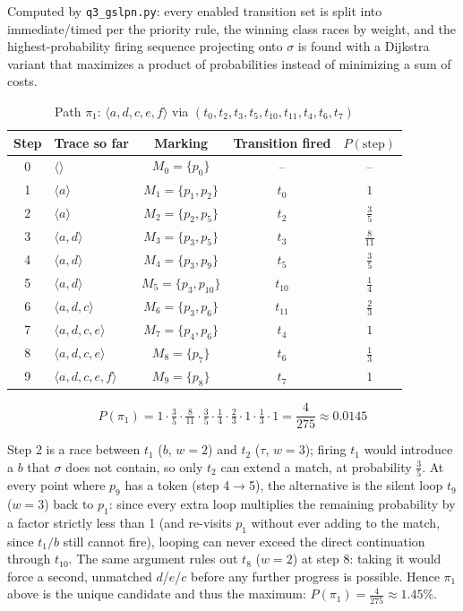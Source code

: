 \documentclass[11pt,a4paper]{article}
\makeatletter
\newenvironment{pathtrace}[2]{%
  \def\pathtracecaption{#1}%
  \def\pathtracelabel{#2}%
  \begin{table}[H]
  \centering
  \begin{tabular}{@{}clccc@{}}
    \toprule
    Step & Trace so far & Marking & Transition fired & $P(\text{step})$ \\
    \midrule
}{%
    \bottomrule
  \end{tabular}
  \caption{\pathtracecaption}
  \label{\pathtracelabel}
  \end{table}
}
\makeatother
\begin{document}
Computed by \texttt{q3\_gslpn.py}: every enabled transition set is
split into immediate/timed per the priority rule, the winning class races by weight, and the
highest-probability firing sequence projecting onto $\sigma$ is found with a Dijkstra variant
that maximizes a product of probabilities instead of minimizing a sum of costs.

\begin{pathtrace}{Path $\pi_1$: $\langle a,d,c,e,f\rangle$ via $(t_0,t_2,t_3,t_5,t_{10},t_{11},t_4,t_6,t_7)$}{tab:q3a-pi1}
      0 & $\langle\rangle$           & $M_0 = \{p_0\}$        & --      & --             \\
      1 & $\langle a\rangle$         & $M_1 = \{p_1,p_2\}$    & $t_0$   & $1$            \\
      2 & $\langle a\rangle$         & $M_2 = \{p_2,p_5\}$    & $t_2$   & $\frac{3}{5}$  \\
      3 & $\langle a,d\rangle$       & $M_3 = \{p_3,p_5\}$    & $t_3$   & $\frac{8}{11}$ \\
      4 & $\langle a,d\rangle$       & $M_4 = \{p_3,p_9\}$    & $t_5$   & $\frac{3}{5}$  \\
      5 & $\langle a,d\rangle$       & $M_5 = \{p_3,p_{10}\}$ & $t_{10}$ & $\frac{1}{4}$ \\
      6 & $\langle a,d,c\rangle$     & $M_6 = \{p_3,p_6\}$    & $t_{11}$ & $\frac{2}{3}$ \\
      7 & $\langle a,d,c,e\rangle$   & $M_7 = \{p_4,p_6\}$    & $t_4$   & $1$            \\
      8 & $\langle a,d,c,e\rangle$   & $M_8 = \{p_7\}$        & $t_6$   & $\frac{1}{3}$  \\
      9 & $\langle a,d,c,e,f\rangle$ & $M_9 = \{p_8\}$        & $t_7$   & $1$            \\
\end{pathtrace}

\[
      P(\pi_1) = 1\cdot\tfrac{3}{5}\cdot\tfrac{8}{11}\cdot\tfrac{3}{5}\cdot\tfrac{1}{4}\cdot\tfrac{2}{3}\cdot1\cdot\tfrac{1}{3}\cdot1 = \frac{4}{275} \approx 0.0145
\]

Step 2 is a race between $t_1$ ($b$, $w=2$) and $t_2$ ($\tau$, $w=3$); firing $t_1$ would
introduce a $b$ that $\sigma$ does not contain, so only $t_2$ can extend a match, at probability
$\frac{3}{5}$. At every point where $p_9$ has a token (step 4$\to$5), the alternative is the
silent loop $t_9$ ($w=3$) back to $p_1$: since every extra loop multiplies the remaining
probability by a factor strictly less than 1 (and re-visits $p_1$ without ever adding to the
match, since $t_1/b$ still cannot fire), looping can never exceed the direct continuation
through $t_{10}$. The same argument rules out $t_8$ ($w=2$) at step 8: taking it would force a
second, unmatched $d$/$e$/$c$ before any further progress is possible. Hence $\pi_1$ above is
the unique candidate and thus the maximum: $P(\pi_1) = \frac{4}{275} \approx 1.45\%$.
\end{document}
